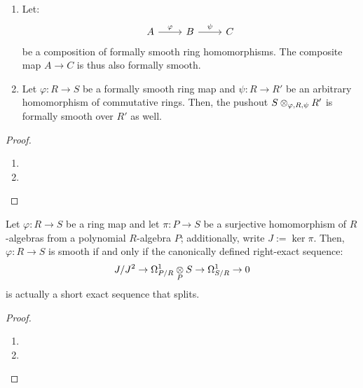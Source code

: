                 \begin{proposition} \label{prop: compositions_and_base_changes_of_formally_smooth_morphisms}
                    \noindent
                    \begin{enumerate}
                        \item Let:
                            $$
                                \begin{tikzcd}
                                	A & B & C
                                	\arrow["\varphi", from=1-1, to=1-2]
                                	\arrow["\psi", from=1-2, to=1-3]
                                \end{tikzcd}
                            $$
                        be a composition of formally smooth ring homomorphisms. The composite map $A \to C$ is thus also formally smooth.
                        \item Let $\varphi: R \to S$ be a formally smooth ring map and $\psi: R \to R'$ be an arbitrary homomorphism of commutative rings. Then, the pushout $S \tensor_{\varphi, R, \psi} R'$ is formally smooth over $R'$ as well.
                    \end{enumerate}
                \end{proposition}
                    \begin{proof}
                        \noindent
                        \begin{enumerate}
                            \item 
                            \item 
                        \end{enumerate}
                    \end{proof}
                    
                \begin{lemma} \label{lemma: canonical_short_exact_sequence_splits}
                    Let $\varphi: R \to S$ be a ring map and let $\pi: P \to S$ be a surjective homomorphism of $R$-algebras from a polynomial $R$-algebra $P$; additionally, write $J := \ker \pi$. Then, $\varphi: R \to S$ is smooth if and only if the canonically defined right-exact sequence:
                        $$J/J^2 \to \Omega^1_{P/R} \tensor_P S \to \Omega^1_{S/R} \to 0$$
                    is actually a short exact sequence that splits.
                \end{lemma}
                    \begin{proof}
                        \noindent
                        \begin{enumerate}
                            \item 
                            \item 
                        \end{enumerate}
                    \end{proof}
                
